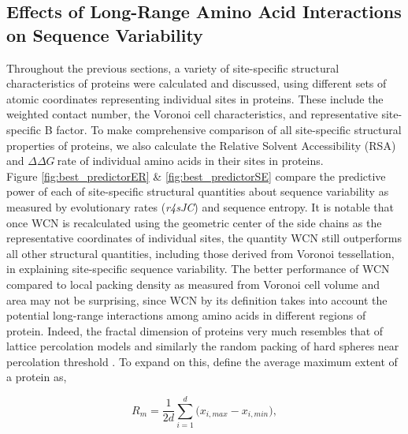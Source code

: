 \documentclass[11pt]{article}
\newcommand{\ddg}{$\Delta\Delta G~$}
\begin{document}


    \subsection*{Effects of Long-Range Amino Acid Interactions on Sequence Variability}

    Throughout the previous sections, a variety of site-specific structural characteristics of proteins were calculated and discussed, using different sets of atomic coordinates representing individual sites in proteins. These include the weighted contact number, the Voronoi cell characteristics, and representative site-specific B factor. To make comprehensive comparison of all site-specific structural properties of proteins, we also calculate the Relative Solvent Accessibility (RSA) and \ddg rate \citep[e.g.,][]{echave_relationship_2014} of individual amino acids in their sites in proteins. \\

    Figure \ref{fig:best_predictorER} \& \ref{fig:best_predictorSE} compare the predictive power of each of site-specific structural quantities about sequence variability as measured by evolutionary rates ({\it r4sJC}) and sequence entropy. It is notable that once WCN is recalculated using the geometric center of the side chains as the representative coordinates of individual sites, the quantity WCN still outperforms all other structural quantities, including those derived from Voronoi tessellation, in explaining site-specific sequence variability. The better performance of WCN compared to local packing density as measured from Voronoi cell volume and area may not be surprising, since WCN by its definition takes into account the potential long-range interactions among amino acids in different regions of protein. Indeed, the fractal dimension of proteins very much resembles that of lattice percolation models \cite{stauffer_introduction_1994} and similarly the random packing of hard spheres near percolation threshold \cite{lorenz_universality_1993, liang_are_2001}. To expand on this, define the average maximum extent of a protein as,



    \begin{equation}
        \label{eqn:max_extent}
        R_m = \frac{1}{2d}\sum_{i=1}^d \big( x_{i,max} - x_{i,min} \big),
    \end{equation}
\end{document}
